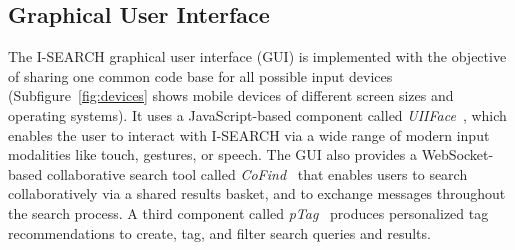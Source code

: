 \documentclass{www2012-comp-accepted}
\let\oldemph\emph
\renewcommand{\emph}[1]{\oldemph{\fontsize{9}{9}\selectfont #1}}
\begin{document}
\subsection{Graphical User Interface}
The \mbox{I-SEARCH} graphical user interface (GUI) is implemented with the objective of sharing one common code base for all possible input devices (Subfigure~\ref{fig:devices} shows mobile devices of different screen sizes and operating systems).
It uses a JavaScript-based component called \emph{UIIFace}~\cite{mmm2012}, which enables the user to interact with \mbox{I-SEARCH} via a wide range of modern input modalities like touch, gestures, or speech.
The GUI also provides a WebSocket-based collaborative search tool called \emph{CoFind}~\cite{mmm2012} that enables users to search collaboratively via a shared results basket, and to exchange messages throughout the search process.
A third component called \emph{pTag}~\cite{mmm2012} produces personalized tag recommendations to create, tag, and filter search queries and results.
\end{document}
